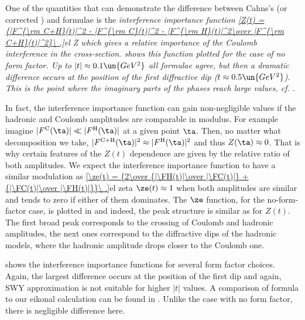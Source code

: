 One of the quantities that can demonstrate the difference between Cahns's (or corrected \KL) and \WY{} formulae is the \em{interference importance} function
\eqref{Z(t) = {|F^{\rm C+H}(t)|^2 - |F^{\rm C}(t)|^2 - |F^{\rm H}(t)|^2\over |F^{\rm C+H}(t)|^2}\ ,}{el Z}
which gives a relative importance of the Coulomb interference in the cross-section.  shows this function plotted for the case of no form factor. Up to $|t| \approx 0.1\un{GeV^2}$ all formulae agree, but then a dramatic difference occurs at the position of the first diffractive dip ($t\approx 0.5\un{GeV^2}$). This is the point where the imaginary parts of the phases reach large values, cf. .


In fact, the interference importance function can gain non-negligible values if the hadronic and Coulomb amplitudes are comparable in modulus. For example imagine $|\FC(\ta)| \ll |\FH(\ta)|$ at a given point $\ta$. Then, no matter what decomposition  we take, $|\FCH(\ta)|^2 \approx |\FH(\ta)|^2$ and thus $Z(\ta) \approx 0$. That is why certain features of the $Z(t)$ dependence are given by the relative ratio of both amplitudes. We expect the interference importance function to have a similar modulation as 
\eqref{\ze(t) = {2\over {|\FH(t)|\over |\FC(t)|} + {|\FC(t)|\over |\FH(t)|}}\ .}{el zeta}
$\ze(t) \approx 1$ when both amplitudes are similar and tends to zero if either of them dominates. The $\ze$ function, for the no-form-factor case, is plotted in  and indeed, the peak structure is similar as for $Z(t)$. The first broad peak corresponds to the crossing of Coulomb and hadronic amplitudes, the next ones correspond to the diffractive dips of the hadronic models, where the hadronic amplitude drops closer to the Coulomb one.

 shows the interference importance functions for several form factor choices. Again, the largest difference occurs at the position of the first dip and again, SWY approximation is not suitable for higher $|t|$ values. A comparison of \KL{} formula to our eikonal calculation can be found in . Unlike the case with no form factor, there is negligible difference here.


